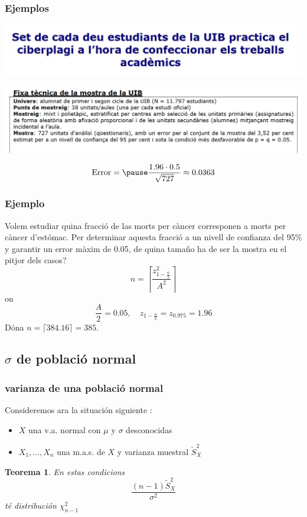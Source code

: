 \documentclass[12pt,t]{beamer}\usepackage[]{graphicx}\usepackage[]{color}
\renewcommand{\emph}[1]{{\color{red}#1}}
\theoremstyle{plain}
\newtheorem{teorema}{Teorema}
\theoremstyle{definition}
\begin{document}
\begin{frame}
\frametitle{Ejemplos}

\begin{center}
\hspace*{-0.5cm}
\includegraphics[width=1.1\linewidth]{plagiUIB1.jpg}\bigskip

\hspace*{-0.5cm}\includegraphics[width=1.1\linewidth]{plagiUIB2.jpg}
\end{center}
$$
\mbox{Error}=\pause \frac{1.96\cdot 0.5}{\sqrt{727}}\approx 0.0363
$$
\end{frame}



\begin{frame}
\frametitle{Ejemplo}
Volem estudiar quina fracció de las morts per càncer corresponen a morts per càncer d'estómac. Per determinar aquesta fracció a un nivell de confianza  del 95\% y garantir un error màxim de 0.05, de quina  tamaño  ha de ser la mostra \emph{en el pitjor dels casos}?
$$
n=\left\lceil\frac{z_{1-\frac{\alpha}{2}}^2}{A^2}\right\rceil
$$
on
$$
\frac{A}{2}=0.05,\quad z_{1-\frac{\alpha}{2}}=z_{0.975}=1.96
$$
Dóna $n= \lceil 384.16\rceil=385$.

\end{frame}




\subsection{$\sigma$ de població normal}
\begin{frame}
\frametitle{varianza de una població normal}


Consideremos ara la situación siguiente  :
\begin{itemize}
\item  $X$ una v.a. normal con $\mu$ y $\sigma$ desconocidas

\item $X_1,\ldots,X_n$ una m.a.s. de $X$ y varianza muestral $\widetilde{S}_X^2$
\end{itemize}


\begin{teorema}
En estas  condicions
$$
\frac{(n-1) \tilde{S}_{X}^2}{\sigma^2}
$$
té distribución $\chi^2_{n-1}$
\end{teorema}
\end{frame}
\end{document}
